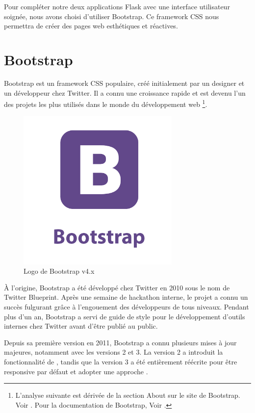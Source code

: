         Pour compléter notre deux applications Flask avec une interface utilisateur soignée, nous avons choisi d'utiliser Bootstrap. Ce framework CSS nous permettra de créer des pages web esthétiques et réactives.
        
        \section{Bootstrap}
        Bootstrap est un framework CSS \opso populaire, créé initialement par un designer et un développeur chez Twitter. Il a connu une croissance rapide et est devenu l'un des projets \opso les plus utilisés dans le monde du développement web \footnote{L'analyse suivante est dérivée de la section About sur le site de Bootstrap. Voir \cite{bootstrap_about}. Pour la documentation de Bootstrap, Voir \cite{bootstrap_doc}.}.

        \begin{figure}[h!]
            \centering
            \includegraphics[width=8cm]{02_images/part_01/07_bootstrap_04_logo.png}
            \caption{Logo de Bootstrap v4.x}
        \end{figure}
        
        À l'origine, Bootstrap a été développé chez Twitter en 2010 sous le nom de Twitter Blueprint. Après une semaine de hackathon interne, le projet a connu un succès fulgurant grâce à l'engouement des développeurs de tous niveaux. Pendant plus d'un an, Bootstrap a servi de guide de style pour le développement d'outils internes chez Twitter avant d'être publié au public.

        Depuis sa première version en 2011, Bootstrap a connu plusieurs mises à jour majeures, notamment avec les versions 2 et 3. La version 2 a introduit la fonctionnalité de , tandis que la version 3 a été entièrement réécrite pour être responsive par défaut et adopter une approche .

